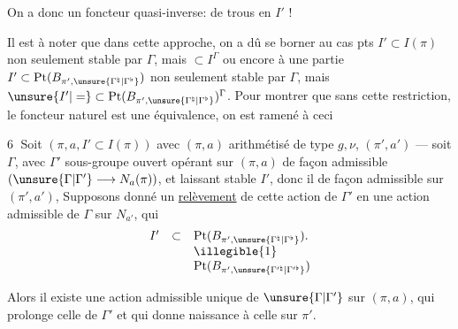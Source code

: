 
On a donc un foncteur quasi-inverse:
 de trous en $I'$ !


Il est à noter que dans cette approche, on a dû se borner au cas
  pts 
$I'\subset I(\pi)$ non seulement stable par $\Gamma$, mais
 $\subset I^\Gamma$
 ou encore à une partie
$I'\subset\mathrm{Pt}(B_{\pi',\unsure{\Gamma^{\natural}|\Gamma^{\flat}}})$
non seulement stable par $\Gamma$, mais
$\unsure{I'|=}\subset\mathrm{Pt}(B_{\pi',\unsure{\Gamma^{\natural}|\Gamma^{\flat}}})^\Gamma$.
Pour montrer que sans cette restriction, le foncteur naturel
  est 
une équivalence, on est ramené à ceci

\textcircled{6} Soit $(\pi,a,I'\subset I(\pi))$ avec $(\pi,a)$
   arithmétisé de type
$g,\nu$,  $(\pi',a')$ --- soit $\Gamma$, avec $\Gamma'$
sous-groupe ouvert opérant sur $(\pi,a)$ de façon admissible
$(\unsure{\Gamma|\Gamma'}\longrightarrow N_a(\pi))$,
et laissant stable $I'$, donc il  de façon admissible sur
$(\pi',a')$,
Supposons donné un \uline{relèvement} de cette action de $\Gamma'$
en une action admissible de $\Gamma$ sur $N_{a'}$, qui 
\[
\begin{array}{rcl}
I'&\subset&\mathrm{Pt}(B_{\pi',\unsure{\Gamma^{\natural}|\Gamma^{\flat}}}).\\
&&\illegible{1}\\
&&\mathrm{Pt}(B_{\pi',\unsure{\Gamma^{\prime\natural}|\Gamma^{\prime\flat}}})
\end{array}
\]


Alors il existe une action admissible unique de $\unsure{\Gamma|\Gamma'}$
sur $(\pi,a)$, qui prolonge celle de $\Gamma'$ et qui donne naissance
à celle  sur $\pi'$.
